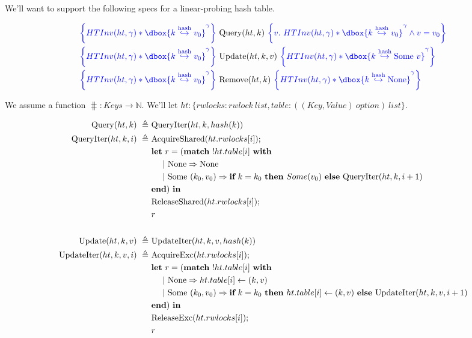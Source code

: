 \documentclass{article}
\newcommand\dboxed[1]{\dbox{\vphantom{t}\ensuremath{#1}}}
\renewcommand{\eqdef}{\triangleq}
\begin{document}
We'll want to support the following specs for a linear-probing hash table.

\begin{align*}
\inlinehoare{\HTInv(ht,\gamma) * \dboxed{k \hashto v_0}^\gamma} &~ \Query(ht,k) ~ \inlinehoare{v.~ \HTInv(ht,\gamma) * \dboxed{k \hashto v_0}^\gamma \land v = v_0}\\
\inlinehoare{\HTInv(ht,\gamma) * \dboxed{k \hashto v_0}^\gamma} &~ \Update(ht,k, v) ~ \inlinehoare{\HTInv(ht,\gamma) * \dboxed{k \hashto \Some~v}^\gamma}\\
\inlinehoare{\HTInv(ht,\gamma) * \dboxed{k \hashto v_0}^\gamma} &~ \Remove(ht,k) ~ \inlinehoare{\HTInv(ht,\gamma) * \dboxed{k \hashto \None}^\gamma}
\end{align*}

We assume a function $\hash : Keys \to \mathbb{N}$. We'll let $ht : \{rwlocks: rwlock~list, table: ((Key,Value)~option)~list\}$.

\begin{align*}
  \Query(ht,k) ~\eqdef~ & \QueryIter(ht,k,\hash(k))\\
  \QueryIter(ht,k,i) ~\eqdef~ & 
      \AcquireShared(ht.rwlocks[i]);\\
      &\langlet r = (\langmatch~ !ht.table[i] ~\langwith\\
      &~~~~ |~ \None \Rightarrow \None\\
      &~~~~ |~ \Some~(k_0,v_0) \Rightarrow
          \langif~ k = k_0 ~\langthen~ Some(v_0) ~\langelse~ \QueryIter(ht,k,i+1)\\
      &\langend) ~\langin\\
      &\ReleaseShared(ht.rwlocks[i]);\\
      &r\\
      \\
  \Update(ht,k,v) ~\eqdef~ & \UpdateIter(ht,k,v,\hash(k))\\
  \UpdateIter(ht,k,v,i) ~\eqdef~ & 
      \AcquireExc(ht.rwlocks[i]);\\
      &\langlet r = (\langmatch~ !ht.table[i] ~\langwith\\
      &~~~~ |~ \None \Rightarrow ht.table[i] \langassign (k,v)\\
      &~~~~ |~ \Some~(k_0,v_0) \Rightarrow
          \langif~ k = k_0 ~\langthen~ ht.table[i] \langassign (k,v) ~\langelse~ \UpdateIter(ht,k,v,i+1)\\
      &\langend) ~\langin\\
      &\ReleaseExc(ht.rwlocks[i]);\\
      &r
\end{align*}
\end{document}
